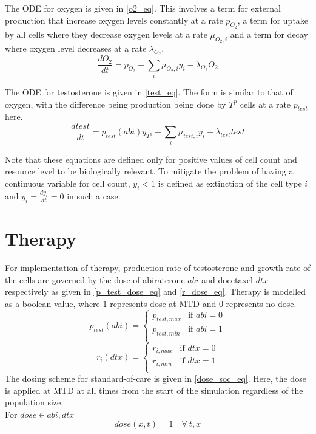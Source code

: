 The ODE for oxygen is given in \autoref{o2_eq}. This involves a term for external production that increase oxygen levels constantly at a rate $p_{O_2}$, a term for uptake by all cells where they decrease oxygen levels at a rate $\mu_{O_2,i}$ and a term for decay where oxygen level decreases at a rate $\lambda_{O_2}$.
\begin{equation}
  \frac{dO_2}{dt} = p_{O_2} - \sum_i \mu_{O_2,i} y_i - \lambda_{O_2} O_2
  \label{o2_eq}
\end{equation}

The ODE for testosterone is given in \autoref{test_eq}. The form is similar to that of oxygen, with the difference being production being done by $T^p$ cells at a rate $p_{test}$ here.
\begin{equation}
  \frac{dtest}{dt} = p_{test}(abi) y_{T^p} - \sum_i \mu_{test,i} y_i - \lambda_{test} test
  \label{test_eq}
\end{equation}

Note that these equations are defined only for positive values of cell count and resource level to be biologically relevant. To mitigate the problem of having a continuous variable for  cell count, $y_i < 1$ is defined as extinction of the cell type $i$ and $y_i = \frac{dy_i}{dt} = 0$ in such a case.

\section{Therapy}
For implementation of therapy, production rate of testosterone and growth rate of the cells are governed by the dose of abiraterone $abi$ and docetaxel $dtx$ respectively as given in \autoref{p_test_dose_eq} and \autoref{r_dose_eq}. Therapy is modelled as a boolean value, where $1$ represents dose at MTD and $0$ represents no dose.
\begin{equation}
  p_{test}(abi) = \begin{cases}
  p_{test,max} &\text{if } abi = 0 \\
  p_{test,min} &\text{if } abi = 1 \\
  \end{cases}
  \label{p_test_dose_eq}
\end{equation}
\begin{equation}
  r_i(dtx) = \begin{cases}
  r_{i,max} &\text{if } dtx = 0 \\
  r_{i,min} &\text{if } dtx = 1 \\
  \end{cases}
  \label{r_dose_eq}
\end{equation}
The dosing scheme for standard-of-care is given in \autoref{dose_soc_eq}. Here, the dose is applied at MTD at all times from the start of the simulation regardless of the population size.\\
For $dose \in {abi,dtx}$
\begin{equation}
  dose(x,t) = 1 \quad \forall\ t, x
  \label{dose_soc_eq}
\end{equation}


